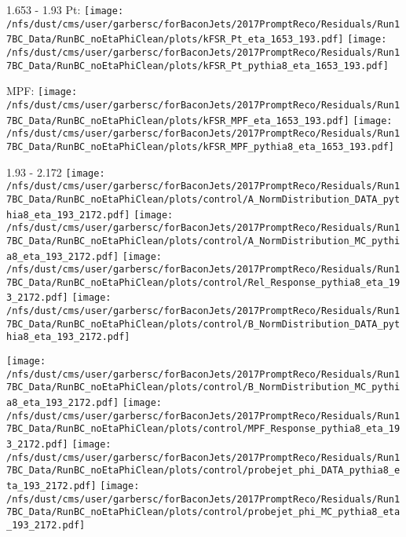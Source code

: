 \documentclass[t,compress]{beamer}
\begin{document}
\begin{frame}{1.653 - 1.93}
	 Pt: \texttt{[image: /nfs/dust/cms/user/garbersc/forBaconJets/2017PromptReco/Residuals/Run17BC\_Data/RunBC\_noEtaPhiClean/plots/kFSR\_Pt\_eta\_1653\_193.pdf]}
	\texttt{[image: /nfs/dust/cms/user/garbersc/forBaconJets/2017PromptReco/Residuals/Run17BC\_Data/RunBC\_noEtaPhiClean/plots/kFSR\_Pt\_pythia8\_eta\_1653\_193.pdf]}
\newline

	 MPF: \texttt{[image: /nfs/dust/cms/user/garbersc/forBaconJets/2017PromptReco/Residuals/Run17BC\_Data/RunBC\_noEtaPhiClean/plots/kFSR\_MPF\_eta\_1653\_193.pdf]}
	\texttt{[image: /nfs/dust/cms/user/garbersc/forBaconJets/2017PromptReco/Residuals/Run17BC\_Data/RunBC\_noEtaPhiClean/plots/kFSR\_MPF\_pythia8\_eta\_1653\_193.pdf]}
\end{frame}

\begin{frame}{1.93 - 2.172}
	\texttt{[image: /nfs/dust/cms/user/garbersc/forBaconJets/2017PromptReco/Residuals/Run17BC\_Data/RunBC\_noEtaPhiClean/plots/control/A\_NormDistribution\_DATA\_pythia8\_eta\_193\_2172.pdf]}
	\texttt{[image: /nfs/dust/cms/user/garbersc/forBaconJets/2017PromptReco/Residuals/Run17BC\_Data/RunBC\_noEtaPhiClean/plots/control/A\_NormDistribution\_MC\_pythia8\_eta\_193\_2172.pdf]}
	\texttt{[image: /nfs/dust/cms/user/garbersc/forBaconJets/2017PromptReco/Residuals/Run17BC\_Data/RunBC\_noEtaPhiClean/plots/control/Rel\_Response\_pythia8\_eta\_193\_2172.pdf]}
	\texttt{[image: /nfs/dust/cms/user/garbersc/forBaconJets/2017PromptReco/Residuals/Run17BC\_Data/RunBC\_noEtaPhiClean/plots/control/B\_NormDistribution\_DATA\_pythia8\_eta\_193\_2172.pdf]}
\newline

	\texttt{[image: /nfs/dust/cms/user/garbersc/forBaconJets/2017PromptReco/Residuals/Run17BC\_Data/RunBC\_noEtaPhiClean/plots/control/B\_NormDistribution\_MC\_pythia8\_eta\_193\_2172.pdf]}
	\texttt{[image: /nfs/dust/cms/user/garbersc/forBaconJets/2017PromptReco/Residuals/Run17BC\_Data/RunBC\_noEtaPhiClean/plots/control/MPF\_Response\_pythia8\_eta\_193\_2172.pdf]}
	\texttt{[image: /nfs/dust/cms/user/garbersc/forBaconJets/2017PromptReco/Residuals/Run17BC\_Data/RunBC\_noEtaPhiClean/plots/control/probejet\_phi\_DATA\_pythia8\_eta\_193\_2172.pdf]}
	\texttt{[image: /nfs/dust/cms/user/garbersc/forBaconJets/2017PromptReco/Residuals/Run17BC\_Data/RunBC\_noEtaPhiClean/plots/control/probejet\_phi\_MC\_pythia8\_eta\_193\_2172.pdf]}
\end{frame}
\end{document}
